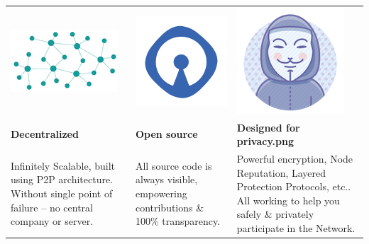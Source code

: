 \centering
\begin{adjustbox}{width=1\textwidth}
\begin{tabularx} {\textwidth}{|Y|Y|Y|}
 \hline
 \includegraphics[scale=0.3]{./static/decentnew.png} & \includegraphics[scale=0.3]{./static/opensource.png} & \includegraphics[scale=0.3]{./static/privacy.png}\\ 
\textbf{Decentralized} & \textbf{Open source} & \textbf{Designed for privacy.png}\\
\hline
Infinitely Scalable, built using P2P architecture. Without single point of failure – no central company or server. & All source code is always visible, empowering contributions \& 100\% transparency. & Powerful encryption, Node Reputation, Layered Protection Protocols, etc.. All working to help you safely \& privately participate in the Network. \\
 \hline
\end{tabularx}
\end{adjustbox}